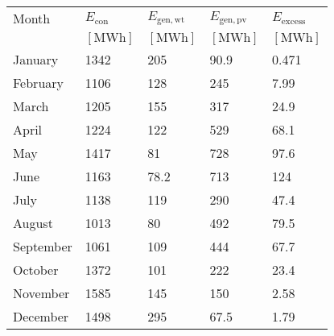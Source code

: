 \begin{table}
\label{tab: MonthlyEnergy}
\begin{tabular}{lllll}
\toprule
Month & $E_{\mathrm{con}}$ & $E_{\mathrm{gen,wt}}$ & $E_{\mathrm{gen,pv}}$ & $E_{\mathrm{excess}}$ \\
 & $\left[\mathrm{MWh}\right]$ & $\left[\mathrm{MWh}\right]$ & $\left[\mathrm{MWh}\right]$ & $\left[\mathrm{MWh}\right]$ \\
\midrule
January & 1342 & 205 & 90.9 & 0.471 \\
February & 1106 & 128 & 245 & 7.99 \\
March & 1205 & 155 & 317 & 24.9 \\
April & 1224 & 122 & 529 & 68.1 \\
May & 1417 & 81 & 728 & 97.6 \\
June & 1163 & 78.2 & 713 & 124 \\
July & 1138 & 119 & 290 & 47.4 \\
August & 1013 & 80 & 492 & 79.5 \\
September & 1061 & 109 & 444 & 67.7 \\
October & 1372 & 101 & 222 & 23.4 \\
November & 1585 & 145 & 150 & 2.58 \\
December & 1498 & 295 & 67.5 & 1.79 \\
\bottomrule
\end{tabular}
\end{table}

